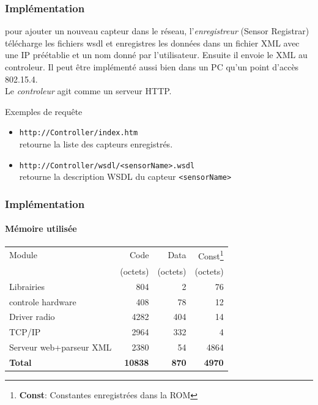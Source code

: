 \begin{frame}
 \frametitle{Implémentation}
 pour ajouter un nouveau capteur dans le réseau, l'\textit{enregistreur} (Sensor Registrar) télécharge les fichiers wsdl et enregistres les données dans un fichier XML avec une IP préétablie et un nom donné par l'utilisateur.
 Ensuite il envoie le XML au controleur.
 Il peut être implémenté aussi bien dans un PC qu'un point d'accès 802.15.4.\\
 \vspace{4mm}
 Le \textit{controleur} agit comme un serveur HTTP.
 \begin{exampleblock}{Exemples de requête}
 \begin{itemize}
  \item \texttt{http://Controller/index.htm}\\retourne la liste des capteurs enregistrés.
  \item \texttt{http://Controller/wsdl/<sensorName>.wsdl}\\retourne la description WSDL du capteur \texttt{<sensorName>}
 \end{itemize} 
 \end{exampleblock}
\end{frame}


\newcommand{\unite}{(octets)}
\begin{frame}%
 \frametitle{Implémentation}
 \framesubtitle{Mémoire utilisée}
 \begin{center}
 \begin{tabular}{|l|r|r|r|}
  \hline
  Module & Code & Data & Const\footnote{\textbf{Const}: Constantes enregistrées dans la ROM}\\
  ~ & \unite & \unite & \unite \\
  \hline
  Librairies & 804 & 2 & 76\\
  controle hardware & 408 & 78 & 12\\
  Driver radio & 4282 & 404 & 14\\
  TCP/IP & 2964 & 332 & 4\\
  Serveur web+parseur XML & 2380 & 54 & 4864\\
  \hline
  \textbf{Total} & \textbf{10838} & \textbf{870} & \textbf{4970}\\
  \hline
 \end{tabular}
 \end{center}
\end{frame}

 
 
